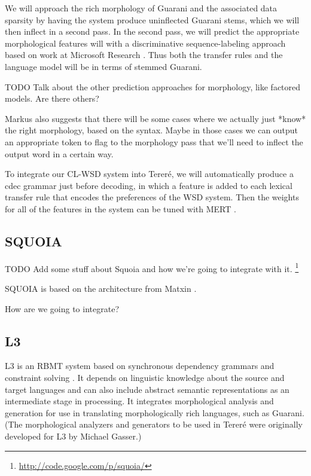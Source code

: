 We will approach the rich morphology of Guarani and the associated data
sparsity by having the system produce uninflected Guarani stems,
which we will then inflect in a second pass.
In the second pass, we will predict the appropriate morphological features will
with a discriminative sequence-labeling approach based on work at Microsoft
Research \cite{toutanova-suzuki-ruopp:2008:ACLMain}.
Thus both the transfer rules and the language model will be in terms of stemmed
Guarani.

TODO Talk about the other prediction approaches for morphology, like factored
models. Are there others?

Markus also suggests that there will be some cases where we actually just
*know* the right morphology, based on the syntax. Maybe in those cases we can
output an appropriate token to flag to the morphology pass that we'll need to
inflect the output word in a certain way.

To integrate our CL-WSD system into Tereré, we will automatically produce a
cdec grammar just before decoding, in which a feature is added to each lexical
transfer rule that encodes the preferences of the WSD system.
Then the weights for all of the features in the system can be tuned with MERT
\cite{och:2003:ACL}.

\subsection{SQUOIA}
TODO Add some stuff about Squoia and how we're going to integrate with it.
\cite{riosgonzales-gohring:2013:HyTra}
\footnote{\url{http://code.google.com/p/squoia/}}


SQUOIA is based on the architecture from Matxin \cite{matxin_2005}. 

How are we going to integrate?

\subsection{L3}

\cite{gasser:sxdg}

L3 is an RBMT system based on synchronous dependency grammars and constraint
solving \cite{gasser:sxdg,gasser:aflat2012}.
It depends on linguistic knowledge about the source and target languages and
can also include abstract semantic representations as an intermediate stage in
processing. It integrates morphological analysis and generation for use in
translating morphologically rich languages, such as Guarani.
(The morphological analyzers and generators to be used in Tereré were
originally developed for L3 by Michael Gasser.)

